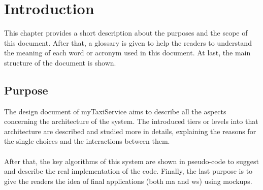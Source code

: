 \documentclass[\mainpath/main]{subfiles}
\begin{document}
\chapter{Introduction} %
\label{introduction}

\setmyfancystyle

This chapter provides a short description about the purposes and the scope of this document. After that, a glossary is given to help the readers to understand the meaning of each word or acronym used in this document. At last, the main structure of the document is shown.

\section{Purpose}
The design document of myTaxiService aims to describe all the aspects concerning the architecture of the system. The introduced tiers or levels into that architecture are described and studied more in details, explaining the reasons for the single choices and the interactions between them.\\
\\
After that, the key algorithms of this system are shown in pseudo-code to suggest and describe the real implementation of the code. Finally, the last purpose is to give the readers the idea of final applications (both \gls{ma} and \gls{ws}) using \glspl{mockup}.
\end{document}
